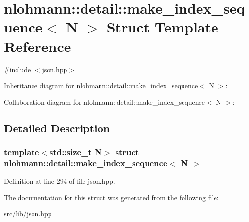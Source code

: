 \hypertarget{structnlohmann_1_1detail_1_1make__index__sequence}{}\section{nlohmann\+:\+:detail\+:\+:make\+\_\+index\+\_\+sequence$<$ N $>$ Struct Template Reference}
\label{structnlohmann_1_1detail_1_1make__index__sequence}


{\ttfamily \#include $<$json.\+hpp$>$}



Inheritance diagram for nlohmann\+:\+:detail\+:\+:make\+\_\+index\+\_\+sequence$<$ N $>$\+:


Collaboration diagram for nlohmann\+:\+:detail\+:\+:make\+\_\+index\+\_\+sequence$<$ N $>$\+:


\subsection{Detailed Description}
\subsubsection*{template$<$std\+::size\+\_\+t N$>$\newline
struct nlohmann\+::detail\+::make\+\_\+index\+\_\+sequence$<$ N $>$}



Definition at line 294 of file json.\+hpp.



The documentation for this struct was generated from the following file\+:\begin{DoxyCompactItemize}
\item 
src/lib/\hyperlink{json_8hpp}{json.\+hpp}\end{DoxyCompactItemize}
